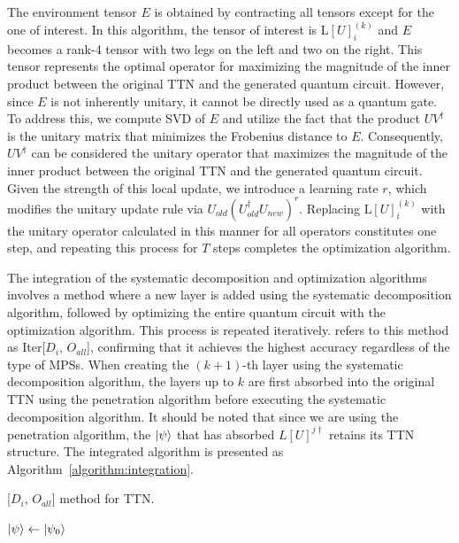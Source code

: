 \documentclass[12pt,dvipdfmx,twoside,openright]{report}
\begin{document}
The environment tensor $E$ is obtained by contracting all tensors except for the one of interest.
In this algorithm, the tensor of interest is $\mathrm{L}[U]^{(k)}_i$ and $E$ becomes a rank-4 tensor with two legs on the left and two on the right.
This tensor represents the optimal operator for maximizing the magnitude of the inner product between the original TTN and the generated quantum circuit.
However, since $E$ is not inherently unitary, it cannot be directly used as a quantum gate.
To address this, we compute SVD of $E$ and utilize the fact that the product $UV^\dagger$ is the unitary matrix that minimizes the Frobenius distance to $E$.
Consequently, $UV^\dagger$ can be considered the unitary operator that maximizes the magnitude of the inner product between the original TTN and the generated quantum circuit.
Given the strength of this local update, we introduce a learning rate $r$, which modifies the unitary update rule via $U_{old}(U_{old}^\dagger U_{new})^r$. 
Replacing $\mathrm{L}[U]^{(k)}_i$ with the unitary operator calculated in this manner for all operators constitutes one step, and repeating this process for $T$ steps completes the optimization algorithm.

The integration of the systematic decomposition and optimization algorithms involves a method where a new layer is added using the systematic decomposition algorithm, followed by optimizing the entire quantum circuit with the optimization algorithm.
This process is repeated iteratively.
\cite{mpsdecomp} refers to this method as Iter[$D_i$, $O_{all}$], confirming that it achieves the highest accuracy regardless of the type of MPSs.
When creating the $(k+1)$-th layer using the systematic decomposition algorithm, the layers up to $k$ are first absorbed into the original TTN using the penetration algorithm before executing the systematic decomposition algorithm.
It should be noted that since we are using the penetration algorithm, the $\ket{\psi}$ that has absorbed $L[U]^{j\dagger}$ retains its TTN structure.
The integrated algorithm is presented as Algorithm~\ref{algorithm:integration}.
\begin{algorithm}[tbp]
 \caption{[$D_i$, $O_{all}$] method for TTN.}
 \label{algorithm:integration}
 $\ket{\psi} \leftarrow{\ket{\psi_0}}$\;
\end{algorithm}
\end{document}
